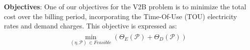 \noindent \textbf{Objectives}: 
One of our objectives for the V2B problem is to minimize the total cost over the billing period, incorporating the Time-Of-Use (TOU) electricity rates and demand charges. This objective is expressed as:
\begin{align}
\label{eq: billing}
\begin{split}
\min_{(\eta,\mathcal{P}) \, \in \textit{Feasible}}%
\left( \Theta_E (\mathcal{P}) + \Theta_D(\mathcal{P}) \right)
\end{split}
\end{align}

